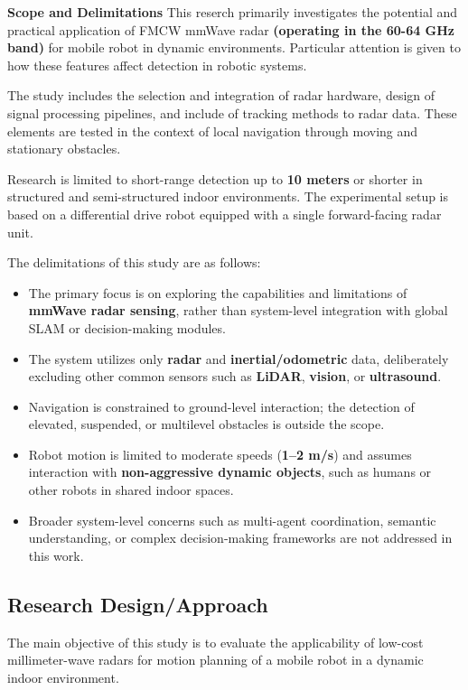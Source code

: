 \textbf{Scope and Delimitations} 
\noindent
This reserch primarily investigates the potential and practical application of FMCW mmWave radar \textbf{(operating in the 60-64 GHz band)} for mobile robot in dynamic environments. Particular attention is given to how these features affect detection in robotic systems.

The study includes the selection and integration of radar hardware, design of signal processing pipelines, and include of tracking methods to radar data. These elements are tested in the context of local navigation through moving and stationary obstacles.

\medskip
Research is limited to short-range detection up to \textbf{10 meters} or shorter in structured and semi-structured indoor environments. The experimental setup is based on a differential drive robot equipped with a single forward-facing radar unit.

\noindent
The delimitations of this study are as follows:

\begin{itemize}
  \item The primary focus is on exploring the capabilities and limitations of \textbf{mmWave radar sensing}, rather than system-level integration with global SLAM or decision-making modules.

  \item The system utilizes only \textbf{radar} and \textbf{inertial/odometric} data, deliberately excluding other common sensors such as \textbf{LiDAR}, \textbf{vision}, or \textbf{ultrasound}.

  \item Navigation is constrained to ground-level interaction; the detection of elevated, suspended, or multilevel obstacles is outside the scope.

  \item Robot motion is limited to moderate speeds (\textbf{1--2 m/s}) and assumes interaction with \textbf{non-aggressive dynamic objects}, such as humans or other robots in shared indoor spaces.

  \item Broader system-level concerns such as multi-agent coordination, semantic understanding, or complex decision-making frameworks are not addressed in this work.
\end{itemize}


\subsection{Research Design/Approach}
The main objective of this study is to evaluate the applicability of low-cost millimeter-wave radars for motion planning of a mobile robot in a dynamic indoor environment.

